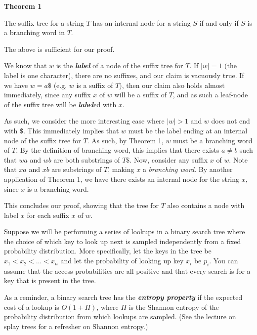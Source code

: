 \documentclass[12pt]{exam}
\newcommand{\Q}[1]{\question{\large{\textbf{#1}}}}
\begin{document}
\begin{questions}
\begin{solution}
\textbf{Theorem 1}

The suffix tree for a string $T$ has an internal node for a string $S$ if and only if $S$ is a branching word in $T$.

The above is sufficient for our proof.

We know that $w$ is the \textit{\textbf{label}} of a node of the suffix tree for $T$. If $|w| = 1$ (the label is one character), there are no suffixes, and our claim is vacuously true. If we have $w = a\$$ (e.g, $w$ is a suffix of $T$), then our claim also holds almost immediately, since any suffix $x$ of $w$ will be a suffix of $T$, and as such a leaf-node of the suffix tree will be \textit{\textbf{label}}ed with $x$.

As such, we consider the more interesting case where $|w| > 1$ and $w$ does not end with $\$$. This immediately implies that $w$ must be the label ending at an internal node of the suffix tree for $T$. As such, by Theorem 1, $w$ must be a branching word of $T$. By the definition of branching word, this implies that there exists $a \neq b$ such that $wa$ and $wb$ are both substrings of $T\$$. Now, consider any suffix $x$ of $w$. Note that $xa$ and $xb$ are substrings of $T$, making $x$ a \textit{branching word}. By another application of Theorem 1, we have there exists an internal node for the string $x$, since $x$ is a branching word.


This concludes our proof, showing that the tree for $T$ also contains a node with label $x$ for each suffix $x$ of $w$.


\end{solution}

\newpage
\Q{Problem Three: Balanced Trees}

Suppose we will be performing a series of lookups in a binary search tree where the choice of which key to look up next is sampled independently from a fixed probability distribution. More specifically, let the keys in the tree be $x_1 < x_2 < \dots < x_n$ and let the probability of looking up key $x_i$ be $p_i$. You can assume that the access probabilities are all positive and that every search is for a key that is present in the tree.

As a reminder, a binary search tree has the \textit{\textbf{entropy property}} if the expected cost of a lookup is $O(1 + H)$, where $H$ is the Shannon entropy of the probability distribution from which lookups are sampled. (See the lecture on splay trees for a refresher on Shannon entropy.)


\end{questions}
\end{document}
